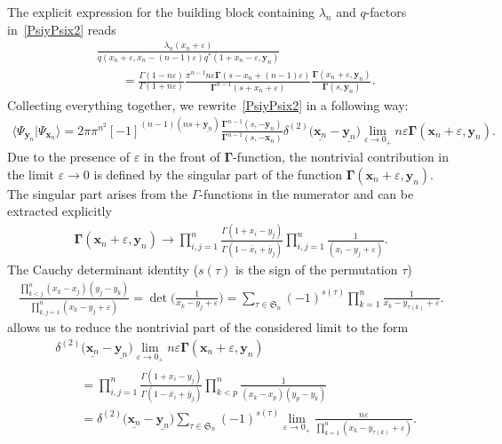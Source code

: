 \documentclass[pdftex]{sigma}
\numberwithin{equation}{section}
\begin{document}
The explicit expression for the building block containing
$\lambda_n$ and $q$-factors in~\eqref{PsiyPsix2} reads
\begin{align*}
&\frac{\lambda_n(x_n+\varepsilon)}
{q(x_n+\varepsilon, x_n-(n-1)\varepsilon) q^\ast(1+x_n-\varepsilon,\bm{y}_n)} \\
& \qquad =
\frac{\Gamma(1-n\varepsilon)}{\Gamma(1+n\varepsilon)} \frac{\pi^{n-1} n\varepsilon
\mathbf{\Gamma}(s-x_n+(n-1)\varepsilon)}{\mathbf{\Gamma}^{n-1}(s+x_n+\varepsilon)}
\frac{\mathbf{\Gamma}(x_n+\varepsilon ,\bm{y}_n)}
{\mathbf{\Gamma}(s ,\bm{y}_n)} .
\end{align*}
Collecting everything together, we rewrite~\eqref{PsiyPsix2} in a following way:
\begin{align*}
\langle\Psi_{\bm{y}_n}|\Psi_{\bm{x}_n}\rangle =
2\pi \pi^{n^2} [-1]^{(n-1)(ns+\underline{\bm{y}_n})}
\frac{\mathbf{\Gamma}^{n-1}(s ,-\bm{y}_n)}
{\mathbf{\Gamma}^{n-1}(s ,-\bm{x}_n)}
\delta^{(2)}\bigl(\underline{\bm{x}_n}-\underline{\bm{y}_n}\bigr)
\lim_{\varepsilon\to 0_+}
n \varepsilon \mathbf{\Gamma}(\bm{x}_n+\varepsilon, \bm{y}_n) .
\end{align*}
Due to the presence of $\varepsilon$ in the front of $\mathbf{\Gamma}$-function, the nontrivial contribution
in the limit $\varepsilon \to 0$ is defined by the singular
part of the function $\mathbf{\Gamma}(\bm{x}_n+\varepsilon, \bm{y}_n)$.
The singular part arises from the $\Gamma$-functions in the numerator
and can be extracted explicitly
\begin{align*}
\mathbf{\Gamma}(\bm{x}_n+\varepsilon, \bm{y}_n) \to
\prod\limits_{i,j=1}^n
\frac{\Gamma(1+x_i-y_j)}{\Gamma(1 -\bar{x}_i+\bar{y}_j)}
\prod\limits_{i,j=1}^n
\frac{1}{(x_i-y_j+\varepsilon)} .
\end{align*}
The Cauchy determinant identity ($s(\tau)$ is the sign of the permutation $\tau$)
\begin{align*}
\frac{\prod\limits_{k<j}^n (x_{k}-x_{j}) (y_{j}-y_{k})}{\prod\limits_{k,j=1}^{n}(x_k-y_j+\varepsilon)}
= \det\biggl(\frac{1}{x_k-y_{j}+\varepsilon}\biggr) =
\sum_{\tau\in \mathfrak{S}_{n}} (-1)^{s(\tau)}
\prod_{k=1}^{n}\frac{1}{x_k-y_{\tau(k)}+\varepsilon} .
\end{align*}
allows us to reduce the nontrivial part of the considered limit to the form
\begin{align*}
&
\delta^{(2)}\bigl(\underline{\bm{x}_n}-\underline{\bm{y}_n}\bigr)
\lim_{\varepsilon\to 0_+}
n \varepsilon \mathbf{\Gamma}(\bm{x}_n+\varepsilon, \bm{y}_n) \\
& \qquad =
\prod\limits_{i,j=1}^n
\frac{\Gamma(1+x_i-y_j)}{\Gamma(1 -\bar{x}_i+\bar{y}_j)}
\prod\limits_{k<p}^n \frac{1}
{(x_{k}-x_{p}) (y_{p}-y_{k})} \\
& \qquad =
\delta^{(2)}\bigl(\underline{\bm{x}_n}-\underline{\bm{y}_n}\bigr)
\sum_{\tau\in \mathfrak{S}_{n}} (-1)^{s(\tau)}
\lim_{\varepsilon\to 0_+}
\frac{n \varepsilon}{\prod_{k=1}^{n}(x_k-y_{\tau(k)}+\varepsilon)} .
\end{align*}
\end{document}
